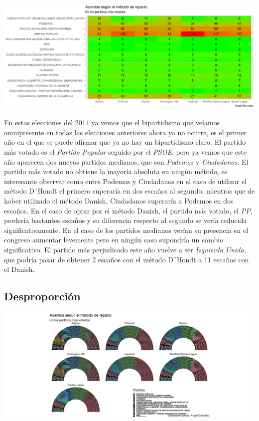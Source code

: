 \documentclass[12pt,a4paper,]{book}
\numberwithin{dummy}{section}
\theoremstyle{ocrenumbox}
\theoremstyle{blacknumex}
\theoremstyle{blacknumbox}
\theoremstyle{ocrenum}
\theoremstyle{ocrenum}
\begin{document}
\begin{center}\includegraphics[width=1\linewidth]{figurasR/unnamed-chunk-109-2} \end{center}

En estas elecciones del 2014 ya vemos que el bipartidismo que veíamos
omnipresente en todas las elecciones anteriores ahora ya no ocurre, es
el primer año en el que se puede afirmar que ya no hay un bipartidismo
claro. El partido más votado es el \emph{Partido Popular} seguido por el
\emph{PSOE}, pero ya vemos que este año aparecen dos nuevos partidos
medianos, que son \emph{Podemos} y \emph{Ciudadanos.} El partido más
votado no obtiene la mayoría absoluta en ningún método, es interesante
observar como entre Podemos y Ciudadanos en el caso de utilizar el
método D´Hondt el primero superaría en dos escaños al segundo, mientras
que de haber utilizado el método Danish, Ciudadanos superaría a Podemos
en dos escaños. En el caso de optar por el método Danish, el partido más
votado, el \emph{PP}, perdería bastantes escaños y su diferencia
respecto al segundo se vería reducida significativamente. En el caso de
los partidos medianos verían su presencia en el congreso aumentar
levemente pero en ningún caso supondría un cambio significativo. El
partido más perjudicado este año vuelve a ser \emph{Izquierda Unida},
que podría pasar de obtener 2 escaños con el método D´Hondt a 11 escaños
con el Danish.

\hypertarget{desproporciuxf3n-11}{%
\subsection{Desproporción}\label{desproporciuxf3n-11}}

\begin{center}\includegraphics[width=1\linewidth]{figurasR/unnamed-chunk-110-1} \end{center}
\end{document}
